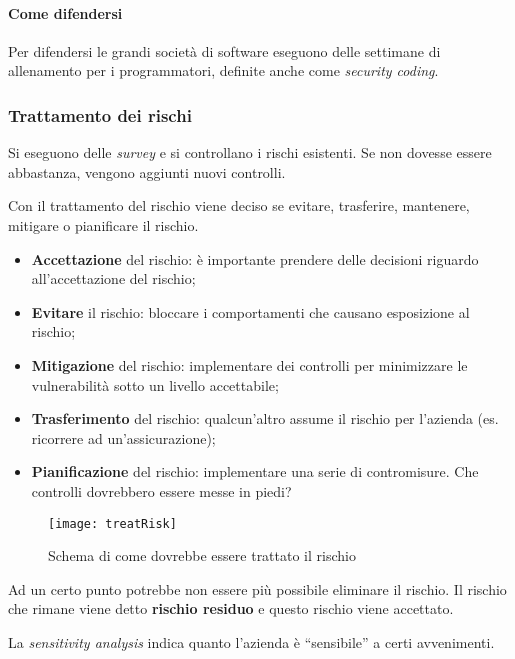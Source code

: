 \paragraph*{Come difendersi}

Per difendersi le grandi società di software eseguono delle settimane di
allenamento per i programmatori, definite anche come \textit{security coding}.



\subsubsection{Trattamento dei rischi}

Si eseguono delle \textit{survey} e si controllano i rischi esistenti. Se non
dovesse essere abbastanza, vengono aggiunti nuovi controlli.

Con il trattamento del rischio viene deciso se evitare, trasferire, mantenere,
mitigare o pianificare il rischio.

\begin{itemize}
\item \textbf{Accettazione} del rischio: è importante prendere delle decisioni 
riguardo all'accettazione del rischio;
\item \textbf{Evitare} il rischio: bloccare i comportamenti che causano 
esposizione al rischio;
\item \textbf{Mitigazione} del rischio: implementare dei controlli per 
minimizzare le vulnerabilità sotto un livello accettabile;
\item \textbf{Trasferimento} del rischio: qualcun'altro assume il rischio per 
l'azienda (es. ricorrere ad un'assicurazione);
\item \textbf{Pianificazione} del rischio: implementare una serie di 
contromisure. Che controlli dovrebbero essere messe in piedi?
\end{itemize}

\begin{figure}[H]
 \centering
 \texttt{[image: treatRisk]}
 \caption{Schema di come dovrebbe essere trattato il rischio}
\end{figure}



Ad un certo punto potrebbe non essere più possibile eliminare il rischio. Il
rischio che rimane viene detto \textbf{rischio residuo} e questo rischio viene
accettato.

La \textit{sensitivity analysis} indica quanto l'azienda è ``sensibile'' a 
certi avvenimenti.

